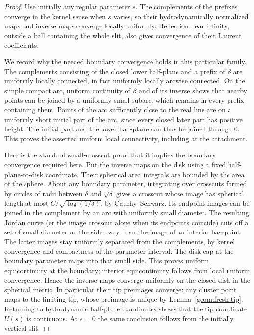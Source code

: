 \begin{proof}
Use initially any regular parameter $s$.  The complements of the
prefixes converge in the kernel sense when $s$ varies, so their
hydrodynamically normalized maps and inverse maps converge locally
uniformly.  Reflection near infinity, outside a ball containing the
whole slit, also gives convergence of their Laurent coefficients.

We record why the needed boundary convergence holds in this particular
family.  The complements consisting of the closed lower half-plane
and a prefix of $\beta$ are uniformly locally connected, in fact
uniformly locally arcwise connected.  On the simple compact arc,
uniform continuity of $\beta$ and of its inverse shows that nearby
points can be joined by a uniformly small subarc, which remains in
every prefix containing them.  Points of the arc sufficiently close
to the real line are on a uniformly short initial part of the arc,
since every closed later part has positive height.  The initial part
and the lower half-plane can thus be joined through $0$.  This proves
the asserted uniform local connectivity, including at the attachment.

Here is the standard small-crosscut proof that it implies the boundary
convergence required here.  Put the inverse maps on the disk using a
fixed half-plane-to-disk coordinate.  Their spherical area integrals
are bounded by the area of the sphere.  About any boundary parameter,
integrating over crosscuts formed by circles of radii between
$\delta$ and $\sqrt\delta$ gives a crosscut whose image has spherical
length at most $C/\sqrt{\log(1/\delta)}$, by Cauchy--Schwarz.  Its
endpoint images can be joined in the complement by an arc with
uniformly small diameter.  The resulting Jordan curve (or the image
crosscut alone when its endpoints coincide) cuts off a set of small
diameter on the side away from the image of an interior basepoint.
The latter images stay uniformly separated from the complements, by
kernel convergence and compactness of the parameter interval.
The disk cap at the boundary parameter maps into that small side.
This proves uniform equicontinuity at the boundary; interior
equicontinuity follows from local uniform convergence.  Hence the
inverse maps converge uniformly on the closed disk in the spherical
metric.  In particular their tip preimages converge: any cluster
point maps to the limiting tip, whose preimage is unique by
Lemma~\ref{geom:fresh-tip}.  Returning to hydrodynamic half-plane
coordinates shows that the tip coordinate $U(s)$ is continuous.
At $s=0$ the same conclusion follows from the initially vertical slit.


\end{proof}
